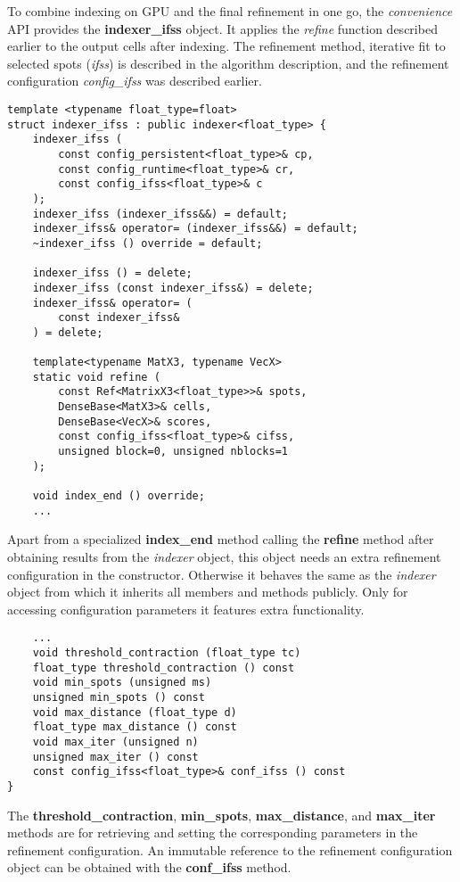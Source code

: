 \documentclass[a4paper,10pt]{article}
\begin{document}
To combine indexing on GPU and the final refinement in one go, the \emph{convenience} API provides the \textbf{indexer\_ifss} object. It applies the \emph{refine} function described earlier to the output cells after indexing. The refinement method, iterative fit to selected spots (\emph{ifss}) is described in the algorithm description, and the refinement configuration \emph{config\_ifss} was described earlier.

\begin{lstlisting}
template <typename float_type=float>
struct indexer_ifss : public indexer<float_type> {
    indexer_ifss (
        const config_persistent<float_type>& cp,
        const config_runtime<float_type>& cr,
        const config_ifss<float_type>& c
    );
    indexer_ifss (indexer_ifss&&) = default;
    indexer_ifss& operator= (indexer_ifss&&) = default;
    ~indexer_ifss () override = default;

    indexer_ifss () = delete;
    indexer_ifss (const indexer_ifss&) = delete;
    indexer_ifss& operator= (
        const indexer_ifss&
    ) = delete;

    template<typename MatX3, typename VecX>
    static void refine (
        const Ref<MatrixX3<float_type>>& spots,
        DenseBase<MatX3>& cells,
        DenseBase<VecX>& scores,
        const config_ifss<float_type>& cifss,
        unsigned block=0, unsigned nblocks=1
    );

    void index_end () override;
    ...
\end{lstlisting}

Apart from a specialized \textbf{index\_end} method calling the \textbf{refine} method after obtaining results from the \emph{indexer} object, this object needs an extra refinement configuration in the constructor. Otherwise it behaves the same as the \emph{indexer} object from which it inherits all members and methods publicly. Only for accessing configuration parameters it features extra functionality.

\begin{lstlisting}
    ...
    void threshold_contraction (float_type tc)
    float_type threshold_contraction () const
    void min_spots (unsigned ms)
    unsigned min_spots () const
    void max_distance (float_type d)
    float_type max_distance () const
    void max_iter (unsigned n)
    unsigned max_iter () const
    const config_ifss<float_type>& conf_ifss () const
}
\end{lstlisting}

The \textbf{threshold\_contraction}, \textbf{min\_spots}, \textbf{max\_distance}, and \textbf{max\_iter} methods are for retrieving and setting the corresponding parameters in the refinement configuration. An immutable reference to the refinement configuration object can be obtained with the \textbf{conf\_ifss} method.
\end{document}
